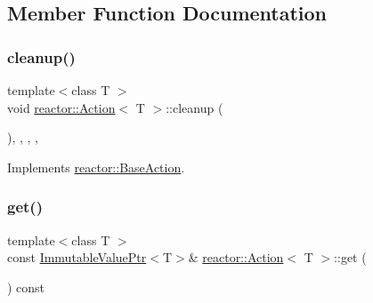 \subsection{Member Function Documentation}
\mbox{\label{classreactor_1_1Action_a4ae275c1b030d5e8111469cc0ca5e09d}} 
\subsubsection{\texorpdfstring{cleanup()}{cleanup()}}
{\footnotesize\ttfamily template$<$class T $>$ \\
void \hyperlink{classreactor_1_1Action}{reactor\+::\+Action}$<$ T $>$\+::cleanup (\begin{DoxyParamCaption}{ }\end{DoxyParamCaption})\hspace{0.3cm}{\ttfamily [inline]}, {\ttfamily [final]}, {\ttfamily [override]}, {\ttfamily [private]}, {\ttfamily [virtual]}}



Implements \hyperlink{classreactor_1_1BaseAction_a7e4ad7157e653054c7afa22b78e46923}{reactor\+::\+Base\+Action}.

\mbox{\label{classreactor_1_1Action_a3b7937c4ce3f0a25562a08734ce8c2dc}} 
\subsubsection{\texorpdfstring{get()}{get()}}
{\footnotesize\ttfamily template$<$class T $>$ \\
const \hyperlink{classreactor_1_1ImmutableValuePtr}{Immutable\+Value\+Ptr}$<$T$>$\& \hyperlink{classreactor_1_1Action}{reactor\+::\+Action}$<$ T $>$\+::get (\begin{DoxyParamCaption}{ }\end{DoxyParamCaption}) const\hspace{0.3cm}{\ttfamily [inline]}}

\mbox{\label{classreactor_1_1Action_a91d6979d528882d4aba1c892c130dbd1}} 
